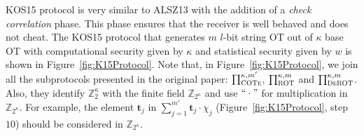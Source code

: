 KOS15 protocol is very similar to ALSZ13 with the addition of a \textit{check correlation} phase. This phase ensures that the receiver is well behaved and does not cheat. The KOS15 protocol that generates $m$ $l$-bit string OT out of $\kappa$ base OT with computational security given by $\kappa$ and statistical security given by $w$ is shown in Figure~\ref{fig:K15Protocol}. Note that, in Figure~\ref{fig:K15Protocol}, we join all the subprotocols presented in the original paper: $\prod^{\kappa, m'}_{\textsc{COTe}}$, $\prod^{\kappa, m}_{\textsc{ROT}}$ and $\prod^{\kappa, m}_{\textsc{DeROT}}$. Also, they identify $\mathbb{Z}^\kappa_2$ with the finite field $\mathbb{Z}_{2^\kappa}$ and use $``\cdot"$ for multiplication in $\mathbb{Z}_{2^\kappa}$. For example, the element $\boldsymbol{t}_j$ in $\sum_{j=1}^{m'} \boldsymbol{t}_j \cdot \chi_j$ (Figure~\ref{fig:K15Protocol}, step $10$) should be considered in $\mathbb{Z}_{2^\kappa}$.


